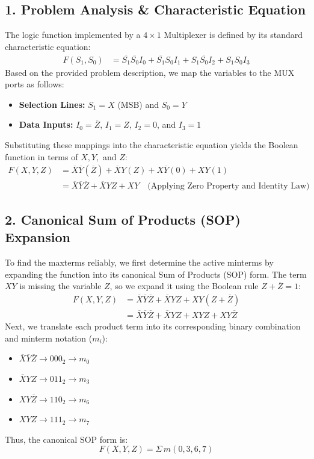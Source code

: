 \documentclass[12pt,a3paper]{article}
\begin{document}
\begin{enumerate}
\begin{tcolorbox}[enhanced,breakable,ansbox,colback=cD!4,colframe=cD,boxrule=0.8pt,arc=5pt,title={\textbf{Answer}},fonttitle=\bfseries\color{white},colbacktitle=cD]
\subsection*{1. Problem Analysis \& Characteristic Equation}
The logic function implemented by a $4 \times 1$ Multiplexer is defined by its standard characteristic equation:
\begin{align*}
    F(S_1, S_0) &= \overline{S_1}\overline{S_0}I_0 + \overline{S_1}S_0I_1 + S_1\overline{S_0}I_2 + S_1S_0I_3
\end{align*}
Based on the provided problem description, we map the variables to the MUX ports as follows:
\begin{itemize}
    \item \textbf{Selection Lines:} $S_1 = X$ (MSB) and $S_0 = Y$
    \item \textbf{Data Inputs:} $I_0 = \overline{Z}$, $I_1 = Z$, $I_2 = 0$, and $I_3 = 1$
\end{itemize}

Substituting these mappings into the characteristic equation yields the Boolean function in terms of $X, Y,$ and $Z$:
\begin{align*}
    F(X, Y, Z) &= \overline{X}\overline{Y}(\overline{Z}) + \overline{X}Y(Z) + X\overline{Y}(0) + XY(1) \\
    &= \overline{X}\overline{Y}\overline{Z} + \overline{X}YZ + XY \quad \text{(Applying Zero Property and Identity Law)}
\end{align*}

\vspace{0.2cm}
\subsection*{2. Canonical Sum of Products (SOP) Expansion}
To find the maxterms reliably, we first determine the active minterms by expanding the function into its canonical Sum of Products (SOP) form. The term $XY$ is missing the variable $Z$, so we expand it using the Boolean rule $Z + \overline{Z} = 1$:
\begin{align*}
    F(X, Y, Z) &= \overline{X}\overline{Y}\overline{Z} + \overline{X}YZ + XY(Z + \overline{Z}) \\
    &= \overline{X}\overline{Y}\overline{Z} + \overline{X}YZ + XYZ + XY\overline{Z}
\end{align*}
Next, we translate each product term into its corresponding binary combination and minterm notation ($m_i$):
\begin{itemize}
    \item $\overline{X}\overline{Y}\overline{Z} \rightarrow 000_2 \rightarrow m_0$
    \item $\overline{X}YZ \rightarrow 011_2 \rightarrow m_3$
    \item $XY\overline{Z} \rightarrow 110_2 \rightarrow m_6$
    \item $XYZ \rightarrow 111_2 \rightarrow m_7$
\end{itemize}
Thus, the canonical SOP form is:
\[ F(X, Y, Z) = \Sigma\,m(0, 3, 6, 7) \]


\end{tcolorbox}
\end{enumerate}
\end{document}
